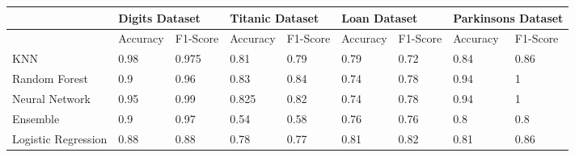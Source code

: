 \documentclass[letterpaper]{article}
\begin{document}
\begin{table}[]
	\centering
	\begin{tabular}{|l|ll|ll|ll|ll|}
		\hline
		                    & \multicolumn{2}{l|}{Digits Dataset} & \multicolumn{2}{l|}{Titanic Dataset} & \multicolumn{2}{l|}{Loan Dataset} & \multicolumn{2}{l|}{Parkinsons Dataset}                                                                                       \\ \hline
		                    & \multicolumn{1}{l|}{Accuracy}       & F1-Score                             & \multicolumn{1}{l|}{Accuracy}     & F1-Score                                & \multicolumn{1}{l|}{Accuracy} & F1-Score & \multicolumn{1}{l|}{Accuracy} & F1-Score \\ \hline
		KNN                 & \multicolumn{1}{l|}{0.98}           & 0.975                                & \multicolumn{1}{l|}{0.81}         & 0.79                                    & \multicolumn{1}{l|}{0.79}     & 0.72     & \multicolumn{1}{l|}{0.84}     & 0.86     \\ \hline
		Random Forest       & \multicolumn{1}{l|}{0.9}            & 0.96                                 & \multicolumn{1}{l|}{0.83}         & 0.84                                    & \multicolumn{1}{l|}{0.74}     & 0.78     & \multicolumn{1}{l|}{0.94}     & 1        \\ \hline
		Neural Network      & \multicolumn{1}{l|}{0.95}           & 0.99                                 & \multicolumn{1}{l|}{0.825}        & 0.82                                    & \multicolumn{1}{l|}{0.74}     & 0.78     & \multicolumn{1}{l|}{0.94}     & 1        \\ \hline
		Ensemble            & \multicolumn{1}{l|}{0.9}            & 0.97                                 & \multicolumn{1}{l|}{0.54}         & 0.58                                    & \multicolumn{1}{l|}{0.76}     & 0.76     & \multicolumn{1}{l|}{0.8}      & 0.8      \\ \hline
		Logistic Regression & \multicolumn{1}{l|}{0.88}           & 0.88                                 & \multicolumn{1}{l|}{0.78}         & 0.77                                    & \multicolumn{1}{l|}{0.81}     & 0.82     & \multicolumn{1}{l|}{0.81}     & 0.86     \\ \hline
	\end{tabular}
\end{table}
\end{document}
